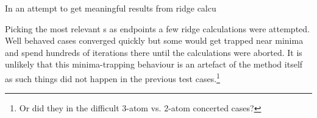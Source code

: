 In an attempt to get meaningful results from ridge calcu



Picking the most relevant s as endpoints a few ridge calculations were attempted.
Well behaved cases converged quickly but some would get trapped near minima and spend hundreds of iterations there until the calculations were aborted.
It is unlikely that this minima-trapping behaviour is an artefact of the method itself as such things did not happen in the previous test cases.\footnote{Or did they in the difficult 3-atom vs. 2-atom concerted cases?}



